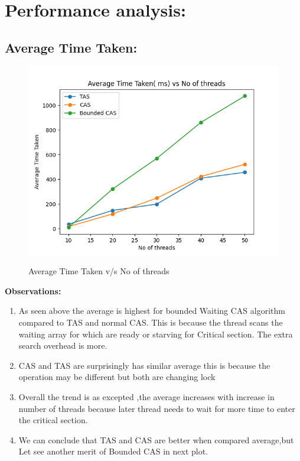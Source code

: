 \documentclass[10pt,a4paper]{article}
\begin{document}
\section{Performance analysis:}
 \subsection{Average Time Taken:}
 \begin{figure}[!ht]
 \includegraphics[scale = 0.8]{fig1}
 \label{}
 \caption{Average Time Taken v/s No of threads}
\end{figure}
\textbf{Observations:}
\begin{enumerate}
	\item As seen above the average is highest for bounded Waiting CAS algorithm  compared to TAS and normal CAS. This is because the thread scans the waiting array for
	which are ready or starving for Critical section. The extra search overhead is more.  
	\item CAS and TAS are surprisingly has similar average this is because the operation may be different but both are changing lock
	\item Overall the trend is as excepted ,the average increases with increase in number of threads because later thread needs to wait for more time to enter the critical section.
	\item We can conclude that TAS and CAS are better when compared average,but 
	Let see another merit of Bounded CAS in next plot.
\end{enumerate}
\pagebreak
\end{document}
